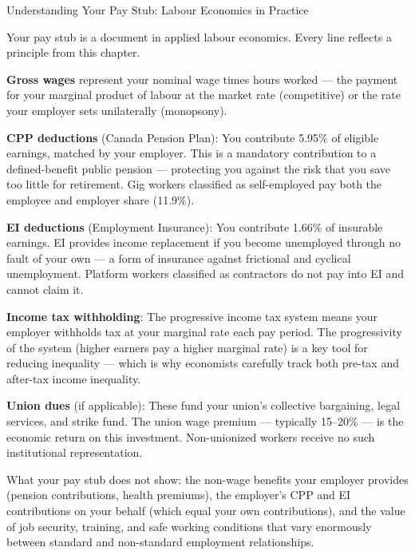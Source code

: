 \begin{everydaylife}{Understanding Your Pay Stub: Labour Economics in Practice}

Your pay stub is a document in applied labour economics. Every line
reflects a principle from this chapter.

\textbf{Gross wages} represent your nominal wage times hours worked ---
the payment for your marginal product of labour at the market rate
(competitive) or the rate your employer sets unilaterally (monopsony).

\textbf{CPP deductions} (Canada Pension Plan): You contribute 5.95\%
of eligible earnings, matched by your employer. This is a mandatory
contribution to a defined-benefit public pension --- protecting you
against the risk that you save too little for retirement. Gig workers
classified as self-employed pay both the employee and employer share
(11.9\%).

\textbf{EI deductions} (Employment Insurance): You contribute 1.66\%
of insurable earnings. EI provides income replacement if you become
unemployed through no fault of your own --- a form of insurance against
frictional and cyclical unemployment. Platform workers classified as
contractors do not pay into EI and cannot claim it.

\textbf{Income tax withholding}: The progressive income tax system means
your employer withholds tax at your marginal rate each pay period.
The progressivity of the system (higher earners pay a higher marginal
rate) is a key tool for reducing inequality --- which is why economists
carefully track both pre-tax and after-tax income inequality.

\textbf{Union dues} (if applicable): These fund your union's collective
bargaining, legal services, and strike fund. The union wage premium ---
typically 15--20\% --- is the economic return on this investment.
Non-unionized workers receive no such institutional representation.

What your pay stub does not show: the non-wage benefits your employer
provides (pension contributions, health premiums), the employer's CPP
and EI contributions on your behalf (which equal your own contributions),
and the value of job security, training, and safe working conditions that
vary enormously between standard and non-standard employment relationships.
\end{everydaylife}

